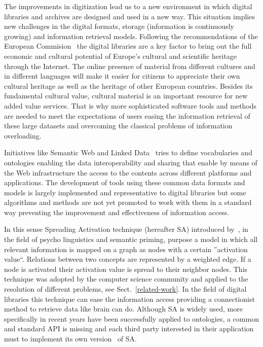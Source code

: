 
The improvements in digitization lead us to a new environment in which digital libraries and archives are designed and used
in a new way. This situation implies new challenges in the digital formats, storage (information is continuously growing) and
information retrieval models. Following the recommendations of the European Commision~\cite{DigitalLibraries} the digital libraries are
a key factor to bring out the full economic and cultural potential of Europe’s cultural and scientific heritage 
through the Internet. The online presence of material from different cultures and in different languages will
make it easier for citizens to appreciate their own cultural heritage as well as the heritage
of other European countries. Besides its fundamental cultural value, cultural material is an important resource for new
added value services. That is why more sophisticated software tools and methods are needed to meet the expectations of users easing
the information retrieval of these large datasets and overcoming the classical problems of information overloading. 

Initiatives like Semantic Web and Linked Data~\cite{LinkedData} tries to define vocabularies and ontologies enabling
the data interoperability and sharing that enable by means of the Web infrastructure the access
to the contents across different platforms and applications. The development of tools using these common
data formats and models is largely implemented and representative to digital libraries
but some algorithms and methods are not yet promoted to work with them in a standard way preventing 
the improvement and effectiveness of information access. 

In this sense Spreading Activation technique (hereafter SA) introduced by~\cite{Collins_Loftus_1975}, in the field of 
psycho linguistics and semantic priming, purpose a model in which all relevant information is mapped
on a graph as nodes with a certain ''activation value``. Relations between two concepts
are represented by a weighted edge. If a node is activated their activation value is spread
to their neighbor nodes. This technique was adopted by the computer science community and applied
to the resolution of different problems, see Sect.~\ref{related-work}. In the field of digital libraries
this technique can ease the information access providing a connectionist method to retrieve data like
brain can do. Although SA is widely used, more specifically in recent years have been successfully applied 
to ontologies, a common and standard API is missing and each third party interested in their application
 must to implement its own version~\cite{SpreadingLarkc} of SA.

